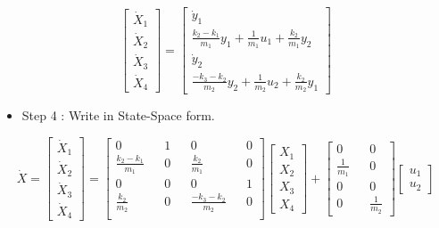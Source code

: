 \documentclass[12pt,a4paper]{article}
\begin{document}
	\[
	\begin{bmatrix}
		\dot{X}_1 \\
		\dot{X}_2 \\
		\dot{X}_3 \\
		\dot{X}_4 
	\end{bmatrix} =
	\begin{bmatrix}
		\dot{y}_1                                                         \\
		\frac{k_2 - k_1}{m_1}y_1 + \frac{1}{m_1}u_1 + \frac{k_2}{m_1}y_2  \\
		\dot{y}_2                                                         \\
		\frac{-k_3 - k_2}{m_2}y_2 + \frac{1}{m_2}u_2 + \frac{k_2}{m_2}y_1 
	\end{bmatrix}
	\]
	\begin{itemize}
		\item Step 4 : Write in State-Space form.
	\end{itemize}
	\[
	\dot{X} = 
	\begin{bmatrix}
		\dot{X}_1 \\
		\dot{X}_2 \\
		\dot{X}_3 \\
		\dot{X}_4 
	\end{bmatrix} =
	\begin{bmatrix}
		0                     &   & 1 &   & 0                      &   & 0 \\
		\frac{k_2 - k_1}{m_1} &   & 0 &   & \frac{k_2}{m_1}        &   & 0 \\
		0                     &   & 0 &   & 0                      &   & 1 \\
		\frac{k_2}{m_2}       &   & 0 &   & \frac{-k_3 - k_2}{m_2} &   & 0 \\
	\end{bmatrix}
	\begin{bmatrix}
		X_1 \\
		X_2 \\
		X_3 \\
		X_4 
	\end{bmatrix} +
	\begin{bmatrix}
		0             &   & 0             \\
		\frac{1}{m_1} &   & 0             \\
		0             &   & 0             \\
		0             &   & \frac{1}{m_2} 
	\end{bmatrix}
	\begin{bmatrix}
		u_1 \\
		u_2 
	\end{bmatrix}
	\]
\end{document}
